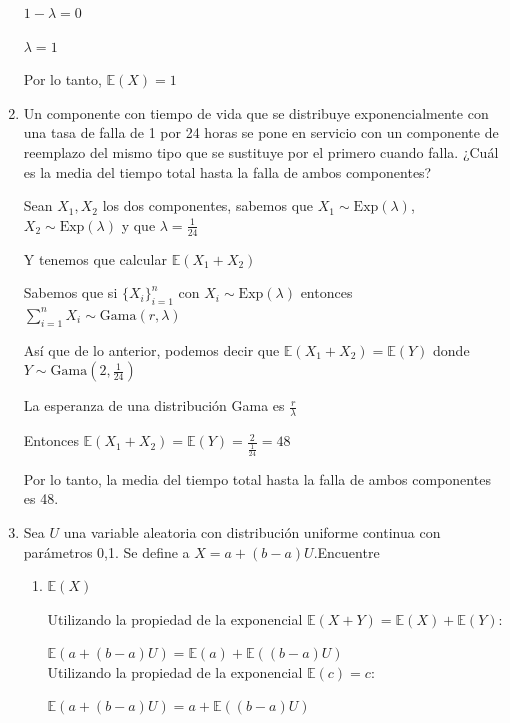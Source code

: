\documentclass[11pt,a4paper]{report}
\begin{document}
\begin{enumerate}
{			$1 - \lambda =  0$

			$\lambda = 1$

			Por lo tanto, $ \mathbb{E}(X) = 1$\\
		}

		\item{
			Un componente con tiempo de vida que se distribuye exponencialmente
			con una tasa de falla de 1 por 24 horas se pone en servicio con un
			componente de reemplazo del mismo tipo que se sustituye por el
			primero cuando falla. ¿Cuál es la media del tiempo total hasta la
			falla de ambos componentes?

			Sean $X_{1}, X_{2}$ los dos componentes, sabemos que $X_{1} \sim \text{Exp}(\lambda)$, $X_{2} \sim \text{Exp}(\lambda)$  y que $\lambda = \frac{1}{24}$

			Y tenemos que calcular $\mathbb{E}(X_{1} + X_{2})$

			Sabemos que si $\{X_i\}_{i=1}^{n}$ con $X_{i} \sim \text{Exp}(\lambda)$ entonces $\sum_{i=1}^{n}  X_{i} \sim \text{Gama}(r, \lambda) $

			Así que de lo anterior, podemos decir que  $\mathbb{E}(X_{1} + X_{2}) = \mathbb{E}(Y)$ donde $Y \sim \text{Gama}(2, \frac{1}{24})$

			La esperanza de una distribución Gama es $\frac{r}{\lambda}$

			Entonces $\mathbb{E}(X_{1} + X_{2}) = \mathbb{E}(Y) = \frac{2}{\frac{1}{24}} = 48$

			Por lo tanto, la media del tiempo total hasta la
			falla de ambos componentes es 48.\\
		}

		\item{
			Sea $U$ una variable aleatoria con distribución uniforme continua
			con parámetros 0,1. Se define a $X = a+(b - a)U$.Encuentre
			\begin{enumerate}
				\item {
					$\mathbb{E}(X)$

					Utilizando la propiedad de la exponencial $\mathbb{E}(X + Y) = \mathbb{E}(X) + \mathbb{E}(Y)$:

					$\mathbb{E}(a+(b - a)U) = \mathbb{E}(a) + \mathbb{E}((b - a)U)$\\

					Utilizando la propiedad de la exponencial $\mathbb{E}(c) = c$:

					$\mathbb{E}(a+(b - a)U) = a + \mathbb{E}((b - a)U)$\\

}
\end{enumerate}}
\end{enumerate}
\end{document}

